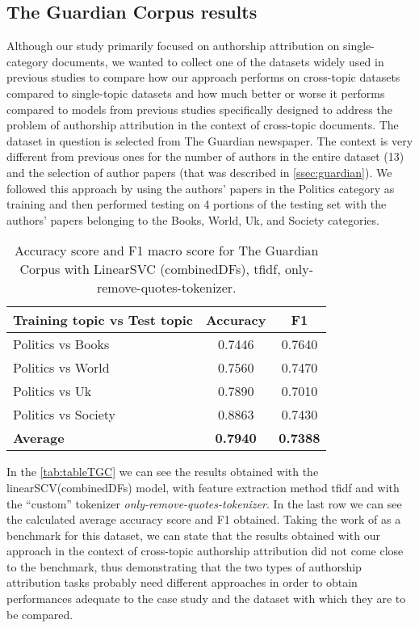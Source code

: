 \subsection{The Guardian Corpus results}
Although our study primarily focused on authorship attribution on single-category documents, we wanted to collect one of the datasets widely used in previous studies to compare how our approach performs on cross-topic datasets compared to single-topic datasets and how much better or worse it performs compared to models from previous studies specifically designed to address the problem of authorship attribution in the context of cross-topic documents.
The dataset in question is selected from The Guardian newspaper. The context is very different from previous ones for the number of authors in the entire dataset (13) and the selection of author papers (that was described in \autoref{ssec:guardian}).
We followed this approach by using the authors' papers in the Politics category as training and then performed testing on 4 portions of the testing set with the authors' papers belonging to the Books, World, Uk, and Society categories.

\begin{table}[h!]
	\begin{center}  
		\caption[The Guardian Corpus Results]{Accuracy score and F1 macro score for The Guardian Corpus with LinearSVC (combinedDFs), tfidf, only-remove-quotes-tokenizer.} 
		\label{tab:tableTGC}
		\begin{tabular}{| p{5 cm} | c | c |}
			\hline 
			Training topic vs Test topic & Accuracy & F1 \\
			\hline
			Politics vs Books & 0.7446 & 0.7640 \\ \hline
			Politics vs World & 0.7560 & 0.7470 \\ \hline
			Politics vs Uk & 0.7890 & 0.7010 \\ \hline
			Politics vs Society & 0.8863 & 0.7430 \\ \hline
			\textbf{Average} & \textbf{0.7940} & \textbf{0.7388} \\ \hline
		\end{tabular} 
	\end{center}
\end{table}

In the \autoref{tab:tableTGC} we can see the results obtained with the linearSCV(combinedDFs) model, with feature extraction method tfidf and with the \enquote{custom} tokenizer \textit{only-remove-quotes-tokenizer}.
In the last row we can see the calculated average accuracy score and F1 obtained.
Taking the work of \cite{posadas2017application} as a benchmark for this dataset, we can state that the results obtained with our approach in the context of cross-topic authorship attribution did not come close to the benchmark, thus demonstrating that the two types of authorship attribution tasks probably need different approaches in order to obtain performances adequate to the case study and the dataset with which they are to be compared.\\


